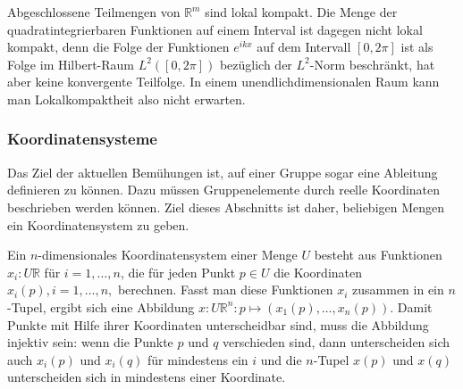 Abgeschlossene Teilmengen von $\mathbb{R}^m$ sind lokal kompakt.
Die Menge der quadratintegrierbaren Funktionen auf einem Interval
ist dagegen nicht lokal kompakt, denn
die Folge der Funktionen $e^{ikx}$ auf dem Intervall $[0,2\pi]$ ist
als Folge im Hilbert-Raum $L^2([0,2\pi])$ 
bezüglich der $L^2$-Norm beschränkt, hat aber keine konvergente
Teilfolge.
In einem unendlichdimensionalen Raum kann man Lokalkompaktheit
also nicht erwarten.

%
%
\subsubsection{Koordinatensysteme}
Das Ziel der aktuellen Bemühungen ist, auf einer Gruppe sogar eine
Ableitung definieren zu können.
Dazu müssen Gruppenelemente durch reelle Koordinaten beschrieben werden
können.
Ziel dieses Abschnitts ist daher, beliebigen Mengen ein Koordinatensystem
zu geben.

%

Ein $n$-dimensionales Koordinatensystem einer Menge $U$ besteht
aus Funktionen $x_i\colon U\mathbb{R}$ für $i=1,\dots,n$, die für
jeden Punkt $p\in U$ die Koordinaten $x_i(p),i=1,\dots,n,$ berechnen.
Fasst man diese Funktionen $x_i$ zusammen in ein $n$-Tupel, ergibt
sich eine Abbildung $x\colon U\mathbb{R}^n:p\mapsto (x_1(p),\dots,x_n(p))$.
Damit Punkte mit Hilfe ihrer Koordinaten unterscheidbar sind, muss
die Abbildung injektiv sein: wenn die Punkte $p$ und $q$ verschieden sind,
dann unterscheiden sich auch $x_i(p)$ und $x_i(q)$ für mindestens ein $i$
und die $n$-Tupel $x(p)$ und $x(q)$ unterscheiden sich in mindestens
einer Koordinate.

